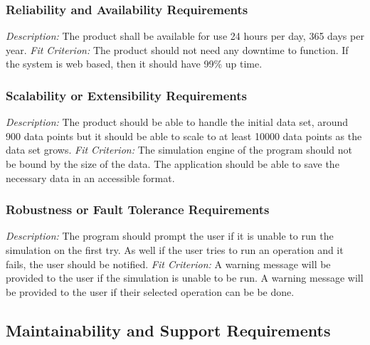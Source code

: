 \documentclass[12pt, titlepage]{article}
\begin{document}
\subsubsection{Reliability and Availability Requirements}
\textit{Description:}\newline
The product shall be available for use 24 hours per day, 365 days per year.
\newline \newline 
\textit{Fit Criterion:}\newline 
The product should not need any downtime to function. If the system is web based, then it should have 99\% up time.

\subsubsection{Scalability or Extensibility Requirements}
\textit{Description:}\newline
The product should be able to handle the initial data set, around 900 data points but it should be able to scale to at least 10000 data points as the data set grows.
\newline \newline 
\textit{Fit Criterion:}\newline 
The simulation engine of the program should not be bound by the size of the data. The application should be able to save the necessary data in an accessible format.

\subsubsection{Robustness or Fault Tolerance Requirements}
\textit{Description:}\newline
The program should prompt the user if it is unable to run the simulation on the first try. As well if the user tries to run an operation and it fails, the user should be notified. 
\newline \newline 
\textit{Fit Criterion:}\newline 
A warning message will be provided to the user if the simulation is unable to be run.
A warning message will be provided to the user if their selected operation can be be done.

\subsection{Maintainability and Support Requirements}
\end{document}
